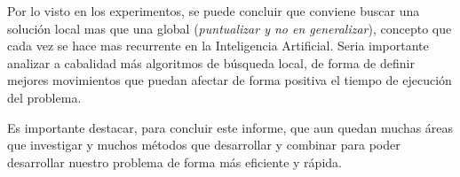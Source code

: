 \documentclass[letter, 10pt]{article}
\begin{document}
Por lo visto en los experimentos, se puede concluir que conviene buscar una solución local mas que una global (\textit{puntualizar y no en generalizar}), concepto que cada vez se hace mas recurrente en la Inteligencia Artificial. Seria importante analizar a cabalidad más algoritmos de búsqueda local, de forma de definir mejores movimientos que puedan afectar de forma positiva el tiempo de ejecución del problema.

Es importante destacar, para concluir este informe, que aun quedan muchas áreas que investigar y muchos métodos que desarrollar y combinar para poder desarrollar nuestro problema de forma más eficiente y rápida.  





\end{document}
